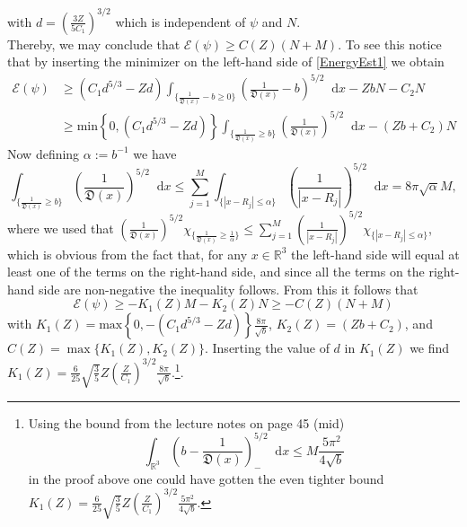\documentclass[a4paper,11pt]{article}
\newcommand{\abs}[1]{\left\lvert #1 \right\rvert}
\newcommand*\diff{\mathop{}\!\mathrm{d}}
\newcommand{\R}{\mathbb{R}}
\numberwithin{equation}{section}
\begin{document}
 with $ d=\left(\frac{3Z}{5C_1}\right)^{3/2}$ which is independent of $ \psi $ and $ N $.\\
  Thereby, we may conclude that $ \mathcal{E}(\psi)\geq C(Z)(N+M) $. To see this notice that by inserting the minimizer on the left-hand side of \eqref{EnergyEst1} we obtain \begin{equation}\begin{aligned}
 \mathcal{E}(\psi)&\geq (C_1d^{5/3}-Zd)\int_{\{\frac{1}{\mathfrak{D}(x)}-b\geq 0\}}\left(\frac{1}{\mathfrak{D}(x)}-b\right)^{5/2}\diff x-ZbN-C_2N\\&\geq\text{min}\left\{0,(C_1d^{5/3}-Zd)\right\}\int_{\{\frac{1}{\mathfrak{D}(x)}\geq b\}}\left(\frac{1}{\mathfrak{D}(x)}\right)^{5/2}\diff x-(Zb+C_2)N
 \end{aligned}
 \end{equation}
 Now defining $ \alpha:=b^{-1} $ we have \begin{equation}
 \int_{\{\frac{1}{\mathfrak{D}(x)}\geq b\}}\left(\frac{1}{\mathfrak{D}(x)}\right)^{5/2}\diff x\leq\sum_{j=1}^{M}\int_{\{\abs{x-R_j}\leq \alpha\}}\left(\frac{1}{\abs{x-R_j}}\right)^{5/2}\diff x=8\pi\sqrt{\alpha} M,
 \end{equation}
 where we used that $\left(\frac{1}{\mathfrak{D}(x)}\right)^{5/2} \chi_{\{\frac{1}{\mathfrak{D}(x)}\geq \frac{1}{\alpha}\}}\leq\sum_{j=1}^{M}\left(\frac{1}{\abs{x-R_j}}\right)^{5/2}\chi_{\{\abs{x-R_j}\leq \alpha\}} $, which is obvious from the fact that, for any $ x\in \R^3 $ the left-hand side will equal at least one of the terms on the right-hand side, and since all the terms on the right-hand side are non-negative the inequality follows.
 From this it follows that \begin{equation}
 \mathcal{E}(\psi)\geq -K_1(Z)M-K_2(Z)N\geq-C(Z)(N+M)
 \end{equation}
 with $ K_1(Z)=\text{max}\left\{0,-(C_1d^{5/3}-Zd)\right\}\frac{8\pi}{\sqrt{b}} $, $ K_2(Z)=(Zb+C_2) $, and $C(Z)=\max\{K_1(Z),K_2(Z)\}$. Inserting the value of $ d $ in $ K_1(Z) $ we find $ K_1(Z)=\frac{6}{25} \sqrt{\frac{3}{5}} Z \left(\frac{Z}{C_1}\right)^{3/2}\frac{8\pi}{\sqrt{b}} $.\footnote{Using the bound from the lecture notes on page 45 (mid)\begin{equation}
 	\int_{\R^3}\left(b-\frac{1}{\mathfrak{D}(x)}\right)^{5/2}_- \diff x\leq M\frac{5\pi^2}{4\sqrt{b}}
 	\end{equation} in the proof above one could have gotten the even tighter bound $ K_1(Z)=\frac{6}{25} \sqrt{\frac{3}{5}} Z \left(\frac{Z}{C_1}\right)^{3/2}\frac{5\pi^2}{4\sqrt{b}} $.}.
 
\end{document}
